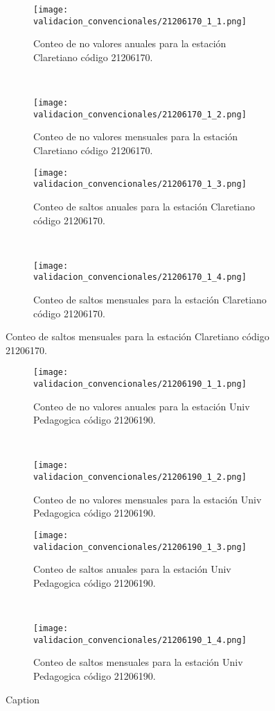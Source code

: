 \begin{figure}[H]\ContinuedFloat
\centering
	\begin{subfigure}[normla]{0.4\textwidth}
	\texttt{[image: validacion\_convencionales/21206170\_1\_1.png]}
		\caption{Conteo de no valores anuales para la estación Claretiano código 21206170.}
		\label{subfig:a1}
		\end{subfigure}
		~
    \begin{subfigure}[normla]{0.4\textwidth}
	\texttt{[image: validacion\_convencionales/21206170\_1\_2.png]}
		\caption{Conteo de no valores mensuales para la estación Claretiano código 21206170.}
		\label{subfig:a2}
		\end{subfigure}
		
    \begin{subfigure}[normla]{0.4\textwidth}
	\texttt{[image: validacion\_convencionales/21206170\_1\_3.png]}
		\caption{Conteo de saltos anuales para la estación Claretiano código 21206170.}
		\label{subfig:a1}
		\end{subfigure}
		~
    \begin{subfigure}[normla]{0.4\textwidth}
	\texttt{[image: validacion\_convencionales/21206170\_1\_4.png]}
		\caption{Conteo de saltos mensuales para la estación Claretiano código 21206170.}
		\label{subfig:a2}
		\end{subfigure}

	
\end{figure}
           
\begin{figure}[H]\ContinuedFloat
\centering
	\begin{subfigure}[normla]{0.4\textwidth}
	\texttt{[image: validacion\_convencionales/21206190\_1\_1.png]}
		\caption{Conteo de no valores anuales para la estación Univ Pedagogica código 21206190.}
		\label{subfig:a1}
		\end{subfigure}
		~
    \begin{subfigure}[normla]{0.4\textwidth}
	\texttt{[image: validacion\_convencionales/21206190\_1\_2.png]}
		\caption{Conteo de no valores mensuales para la estación Univ Pedagogica código 21206190.}
		\label{subfig:a2}
		\end{subfigure}
		
    \begin{subfigure}[normla]{0.4\textwidth}
	\texttt{[image: validacion\_convencionales/21206190\_1\_3.png]}
		\caption{Conteo de saltos anuales para la estación Univ Pedagogica código 21206190.}
		\label{subfig:a1}
		\end{subfigure}
		~
    \begin{subfigure}[normla]{0.4\textwidth}
	\texttt{[image: validacion\_convencionales/21206190\_1\_4.png]}
		\caption{Conteo de saltos mensuales para la estación Univ Pedagogica código 21206190.}
		\label{subfig:a2}
		\end{subfigure}

    
    
    
    \caption{Caption}
    \label{fig:my_label}
\end{figure}